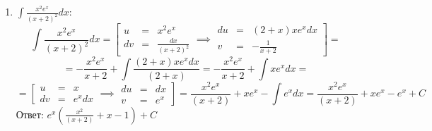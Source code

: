 \documentclass[a4paper,12pt]{article}
\begin{document}
\begin{enumerate}
    \item $\int\frac{x^2e^x}{(x+2)^2}dx$:
    $$\int\frac{x^2e^x}{(x+2)^2}dx = \left[\begin{array}{rcl}
        u & = & x^2e^x \\
        dv & = & \frac{dx}{(x + 2)^2}
    \end{array}\right. \implies \left.\begin{array}{rcl}
        du & = & (2 + x)xe^xdx\\
        v & = & -\frac{1}{x + 2}
    \end{array}\right] =$$
    $$= -\frac{x^2e^x}{x + 2} + \int\frac{(2 + x)xe^x dx}{(2 + x)} = -\frac{x^2e^x}{x + 2} + \int xe^x dx =$$
    $$= \left[\begin{array}{rcl}
        u & = & x \\
        dv & = & e^x dx
    \end{array}\right. \implies \left.\begin{array}{rcl}
        du & = & dx\\
        v & = & e^x
    \end{array}\right] = \frac{x^2e^x}{(x + 2)} + xe^x - \int e^xdx = \frac{x^2e^x}{(x + 2)} + xe^x - e^x + C$$
    Ответ: $e^x\left(\frac{x^2}{(x + 2)} + x - 1\right) + C$
\end{enumerate}
\end{document}
